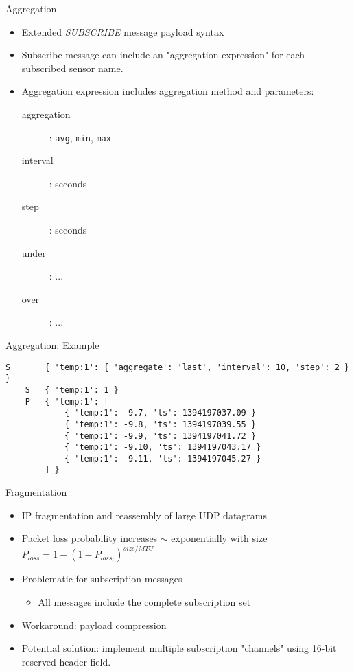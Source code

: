 \documentclass{beamer}
\begin{document}
\begin{frame}{Aggregation}
\begin{itemize}
	\item Extended \emph{SUBSCRIBE} message payload syntax
	\item Subscribe message can include an "aggregation expression" for each subscribed sensor name.
	\item Aggregation expression includes aggregation method and parameters:
	\begin{description}
		\item[aggregation]: \texttt{avg}, \texttt{min}, \texttt{max}
		\item[interval]: seconds
		\item[step]: seconds
		\item[under]: ...
		\item[over]: ...
	\end{description}
\end{itemize}
\end{frame}

\begin{frame}[fragile]{Aggregation: Example}
\footnotesize
\begin{verbatim}
S       { 'temp:1': { 'aggregate': 'last', 'interval': 10, 'step': 2 } }
    S   { 'temp:1': 1 }
    P   { 'temp:1': [
            { 'temp:1': -9.7, 'ts': 1394197037.09 }
            { 'temp:1': -9.8, 'ts': 1394197039.55 }
            { 'temp:1': -9.9, 'ts': 1394197041.72 }
            { 'temp:1': -9.10, 'ts': 1394197043.17 }
            { 'temp:1': -9.11, 'ts': 1394197045.27 }
        ] }
\end{verbatim}
\end{frame}

\begin{frame}{Fragmentation}
\begin{itemize}
	\item IP fragmentation and reassembly of large UDP datagrams
	\item 	Packet loss probability increases $\sim$ exponentially with size \\
			$P_{loss} = 1 - (1 - P_{loss_i})^{size / MTU}$
	\item Problematic for subscription messages
	\begin{itemize}
		\item All messages include the complete subscription set
	\end{itemize}
	\item Workaround: payload compression
	\item Potential solution: implement multiple subscription "channels" using 16-bit reserved header field.
\end{itemize}
\end{frame}
\end{document}
